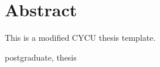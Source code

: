 \section*{Abstract}

This is a modified CYCU thesis template.

\keywords postgraduate, thesis

\clearpage
